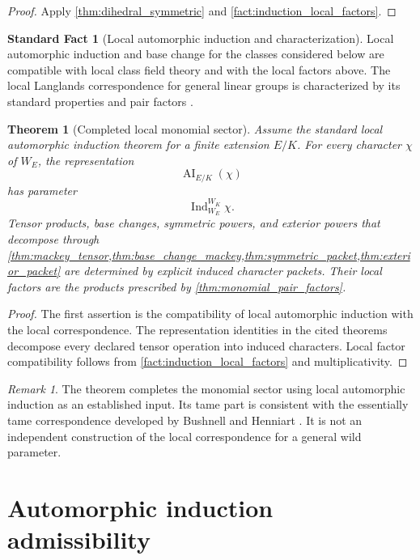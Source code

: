 \documentclass{aomart}
\newtheorem{theorem}{Theorem}[section]
\theoremstyle{definition}
\newtheorem{standardfact}[standardfact]{Standard Fact}
\theoremstyle{remark}
\newtheorem{remark}[remark]{Remark}
\newcommand{\Ind}{\operatorname{Ind}}
\newcommand{\AI}{\operatorname{AI}}
\begin{document}
\begin{proof}
Apply \cref{thm:dihedral_symmetric} and \cref{fact:induction_local_factors}.
\end{proof}

\begin{standardfact}[Local automorphic induction and characterization]\label{fact:local_ai}
Local automorphic induction and base change for the classes considered below are compatible with local class field theory and with the local factors above. The local Langlands correspondence for general linear groups is characterized by its standard properties and pair factors \cite{Henniart1993,Henniart2000,BushnellHenniart2006}.
\end{standardfact}

\begin{theorem}[Completed local monomial sector]\label{thm:local_monomial_completion}
Assume the standard local automorphic induction theorem for a finite extension \(E/K\). For every character \(\chi\) of \(W_E\), the representation
\[
\AI_{E/K}(\chi)
\]
has parameter
\[
\Ind_{W_E}^{W_K}\chi.
\]
Tensor products, base changes, symmetric powers, and exterior powers that decompose through \cref{thm:mackey_tensor,thm:base_change_mackey,thm:symmetric_packet,thm:exterior_packet} are determined by explicit induced character packets. Their local factors are the products prescribed by \cref{thm:monomial_pair_factors}.
\end{theorem}

\begin{proof}
The first assertion is the compatibility of local automorphic induction with the local correspondence. The representation identities in the cited theorems decompose every declared tensor operation into induced characters. Local factor compatibility follows from \cref{fact:induction_local_factors} and multiplicativity.
\end{proof}

\begin{remark}\label{rem:local_scope}
The theorem completes the monomial sector using local automorphic induction as an established input. Its tame part is consistent with the essentially tame correspondence developed by Bushnell and Henniart \cite{BushnellHenniart2005ET1,BushnellHenniart2005ET2,BushnellHenniart2010ET3}. It is not an independent construction of the local correspondence for a general wild parameter.
\end{remark}

\section{Automorphic induction admissibility}\label{sec:ai_admissibility}
\end{document}
